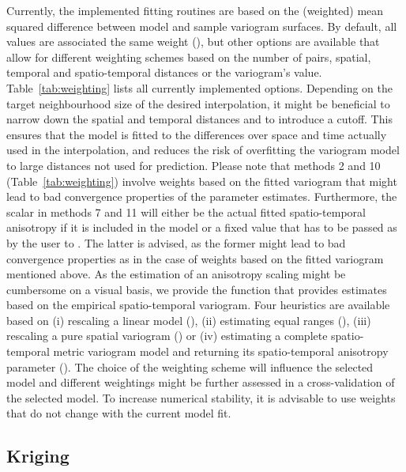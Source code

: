 Currently, the implemented fitting routines are based on the (weighted) mean squared difference between model and sample variogram surfaces. By default, all values are associated the same weight (), but other options are available that allow for different weighting schemes based on the number of pairs, spatial, temporal and spatio-temporal distances or the variogram's value. Table~\ref{tab:weighting} lists all currently implemented options. Depending on the target neighbourhood size of the desired interpolation, it might be beneficial to narrow down the spatial and temporal distances and to introduce a cutoff. This ensures that the model is fitted to the differences over space and time actually used in the interpolation, and reduces the risk of overfitting the variogram model to large distances not used for prediction. Please note that methods 2 and 10 (Table~\ref{tab:weighting}) involve weights based on the fitted variogram that might lead to bad convergence properties of the parameter estimates. Furthermore, the scalar  in methods 7 and 11 will either be the actual fitted spatio-temporal anisotropy if it is included in the model or a fixed value that has to be passed as  by the user to . The latter is advised, as the former might lead to bad convergence properties as in the case of weights based on the fitted variogram mentioned above. As the estimation of an anisotropy scaling might be cumbersome on a visual basis, we provide the function  that provides estimates based on the empirical spatio-temporal variogram. Four heuristics are available based on (i) rescaling a linear model (), (ii) estimating equal ranges (), (iii) rescaling a pure spatial variogram () or (iv) estimating a complete spatio-temporal metric variogram model and returning its spatio-temporal anisotropy parameter (). The choice of the weighting scheme will influence the selected model and different weightings might be further assessed in a cross-validation of the selected model. To increase numerical stability, it is advisable to use weights that do not change with the current  model fit.

\subsection{Kriging}

